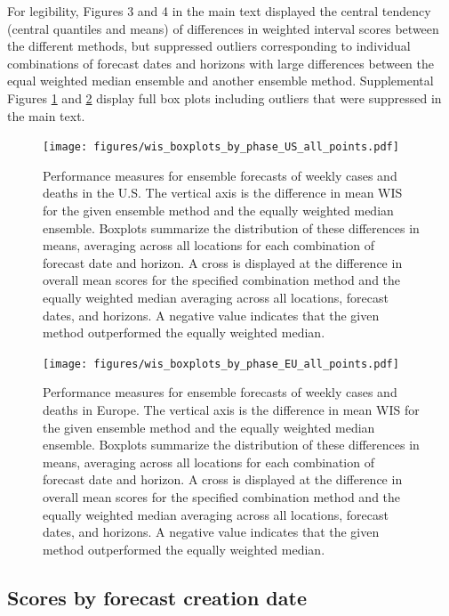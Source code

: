 \documentclass{article}
\begin{document}
For legibility, Figures 3 and 4 in the main text displayed the central tendency (central quantiles and means) of differences in weighted interval scores between the different methods, but suppressed outliers corresponding to individual combinations of forecast dates and horizons with large differences between the equal weighted median ensemble and another ensemble method. Supplemental Figures \ref{fig:wis_boxplots_by_phase_all_points_us} and \ref{fig:wis_boxplots_by_phase_all_points_eu} display full box plots including outliers that were suppressed in the main text.

\begin{figure}[H]
\texttt{[image: figures/wis\_boxplots\_by\_phase\_US\_all\_points.pdf]}
\caption{Performance measures for ensemble forecasts of weekly cases and deaths in the U.S. The vertical axis is the difference in mean WIS for the given ensemble method and the equally weighted median ensemble.
Boxplots summarize the distribution of these differences in means, averaging across all locations for each combination of forecast date and horizon.
A cross is displayed at the difference in overall mean scores for the specified combination method and the equally weighted median averaging across all locations, forecast dates, and horizons.
A negative value indicates that the given method outperformed the equally weighted median.
}
\label{fig:wis_boxplots_by_phase_all_points_us}
\end{figure}

\begin{figure}[H]
\texttt{[image: figures/wis\_boxplots\_by\_phase\_EU\_all\_points.pdf]}
\caption{Performance measures for ensemble forecasts of weekly cases and deaths in Europe. The vertical axis is the difference in mean WIS for the given ensemble method and the equally weighted median ensemble.
Boxplots summarize the distribution of these differences in means, averaging across all locations for each combination of forecast date and horizon.
A cross is displayed at the difference in overall mean scores for the specified combination method and the equally weighted median averaging across all locations, forecast dates, and horizons.
A negative value indicates that the given method outperformed the equally weighted median.
}
\label{fig:wis_boxplots_by_phase_all_points_eu}
\end{figure}

\newpage

\subsection{Scores by forecast creation date}
\end{document}
